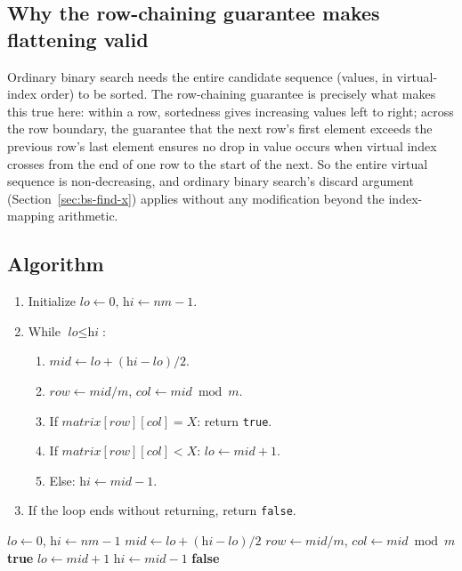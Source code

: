 \subsection*{Why the row-chaining guarantee makes flattening valid}

Ordinary binary search needs the entire candidate sequence (values, in
virtual-index order) to be sorted. The row-chaining guarantee is precisely
what makes this true here: within a row, sortedness gives increasing
values left to right; across the row boundary, the guarantee that the
next row's first element exceeds the previous row's last element ensures
no drop in value occurs when virtual index crosses from the end of one row
to the start of the next. So the entire virtual sequence is non-decreasing,
and ordinary binary search's discard argument
(Section~\ref{sec:bs-find-x}) applies without any modification beyond the
index-mapping arithmetic.

\subsection*{Algorithm}

\begin{enumerate}
  \item Initialize $\textit{lo} \gets 0$, $\textit{hi} \gets nm-1$.
  \item While $\textit{lo} \le \textit{hi}$:
  \begin{enumerate}
    \item $\textit{mid} \gets \textit{lo}+(\textit{hi}-\textit{lo})/2$.
    \item $\textit{row} \gets \textit{mid}/m$, $\textit{col} \gets
          \textit{mid} \bmod m$.
    \item If $\textit{matrix}[\textit{row}][\textit{col}] = X$: return
          \texttt{true}.
    \item If $\textit{matrix}[\textit{row}][\textit{col}] < X$:
          $\textit{lo} \gets \textit{mid}+1$.
    \item Else: $\textit{hi} \gets \textit{mid}-1$.
  \end{enumerate}
  \item If the loop ends without returning, return \texttt{false}.
\end{enumerate}

\begin{algorithm}[H]
\caption{Search in a 2D Matrix}
\begin{algorithmic}[1]
  \State $\textit{lo} \gets 0$, $\textit{hi} \gets nm-1$
    \State $\textit{mid} \gets \textit{lo}+(\textit{hi}-\textit{lo})/2$
    \State $\textit{row} \gets \textit{mid} / m$, $\textit{col} \gets \textit{mid} \bmod m$
     \Return \textbf{true} \EndIf
      \State $\textit{lo} \gets \textit{mid} + 1$
    \Else
      \State $\textit{hi} \gets \textit{mid} - 1$
    \EndIf
  \EndWhile
  \State \Return \textbf{false}
\EndProcedure
\end{algorithmic}
\end{algorithm}

